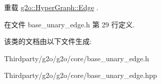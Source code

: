 重载 \hyperlink{classg2o_1_1HyperGraph_1_1Edge_ad8913f1149a0fd5bb628f0f1c8a91a55}{g2o\-::\-Hyper\-Graph\-::\-Edge} .



在文件 base\-\_\-unary\-\_\-edge.\-h 第 29 行定义.



该类的文档由以下文件生成\-:\begin{DoxyCompactItemize}
\item 
Thirdparty/g2o/g2o/core/base\-\_\-unary\-\_\-edge.\-h\item 
Thirdparty/g2o/g2o/core/base\-\_\-unary\-\_\-edge.\-hpp\end{DoxyCompactItemize}
